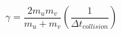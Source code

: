 \documentclass[12pt]{article}
\begin{document}
$$ 
\gamma = \frac{2m_um_v}{m_u+m_v}\left(\frac{1}{\Delta t_{collision}}\right)
$$
\end{document}
